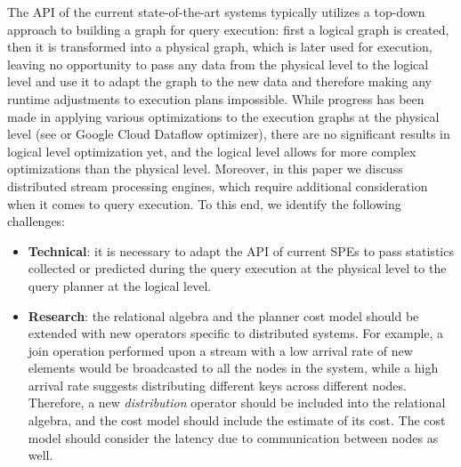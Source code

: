 The API of the current state-of-the-art systems typically utilizes a top-down approach to building a graph for query execution: first a logical graph is created, then it is transformed into a physical graph, which is later used for execution, leaving no opportunity to pass any data from the physical level to the logical level and use it to adapt the graph to the new data and therefore making any runtime adjustments to execution plans impossible. While progress has been made in applying various optimizations to the execution graphs at the physical level (see \cite{grulich2020grizzly} or Google Cloud Dataflow optimizer), there are no significant results in logical level optimization yet, and the logical level allows for more complex optimizations than the physical level. Moreover, in this paper we discuss distributed stream processing engines, which require additional consideration when it comes to query execution. To this end, we identify the following challenges:

\begin{itemize}
    \item \textbf{Technical}: it is necessary to adapt the API of current SPEs to pass statistics collected or predicted during the query execution at the physical level to the query planner at the logical level.
    \item \textbf{Research}: the relational algebra and the planner cost model should be extended with new operators specific to distributed systems. For example, a join operation performed upon a stream with a low arrival rate of new elements would be broadcasted to all the nodes in the system, while a high arrival rate suggests distributing different keys across different nodes. Therefore, a new \textit{distribution} operator should be included into the relational algebra, and the cost model should include the estimate of its cost. The cost model should consider the latency due to communication between nodes as well. 
\end{itemize}




